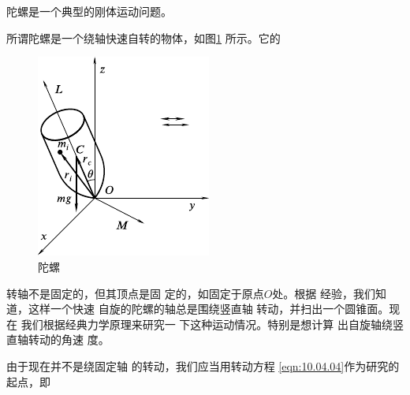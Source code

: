 \section[陀螺]{}\label{sec:10.05}

陀螺是一个典型的刚体运动问题。

所谓陀螺是一个绕轴快速自转的物体，如图\ref{fig:10.21} 所示。它的
\begin{figure}
  \centering
  \includegraphics{figure/fig10.21}
  \caption{陀螺}
  \label{fig:10.21}
\end{figure}
转轴不是固定的，但其顶点是固
定的，如固定于原点$ O $处。根据
经验，我们知道，这样一个快速
自旋的陀螺的轴总是围绕竖直轴
转动，并扫出一个圆锥面。现在
我们根据经典力学原理来研究一
下这种运动情况。特别是想计算
出自旋轴绕竖直轴转动的角速
度。

由于现在并不是绕固定轴
的转动，我们应当用转动方程
\eqref{eqn:10.04.04}作为研究的起点，即

